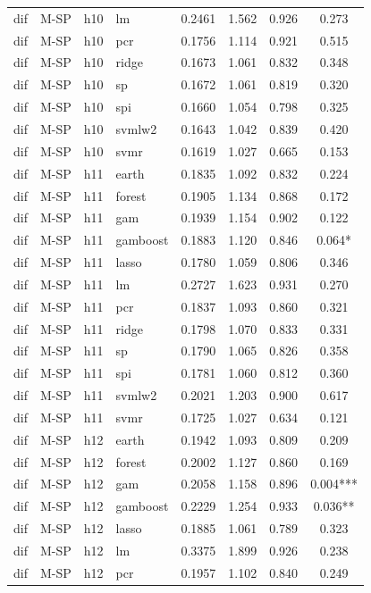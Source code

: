 \begin{ThreePartTable}
\begin{longtable}[t]{llclcccc}
dif & M-SP & h10 & lm & 0.2461 & 1.562 & 0.926 & 0.273\\
dif & M-SP & h10 & pcr & 0.1756 & 1.114 & 0.921 & 0.515\\
dif & M-SP & h10 & ridge & 0.1673 & 1.061 & 0.832 & 0.348\\
dif & M-SP & h10 & sp & 0.1672 & 1.061 & 0.819 & 0.320\\
dif & M-SP & h10 & spi & 0.1660 & 1.054 & 0.798 & 0.325\\
dif & M-SP & h10 & svmlw2 & 0.1643 & 1.042 & 0.839 & 0.420\\
dif & M-SP & h10 & svmr & 0.1619 & 1.027 & 0.665 & 0.153\\
\addlinespace
dif & M-SP & h11 & earth & 0.1835 & 1.092 & 0.832 & 0.224\\
dif & M-SP & h11 & forest & 0.1905 & 1.134 & 0.868 & 0.172\\
dif & M-SP & h11 & gam & 0.1939 & 1.154 & 0.902 & 0.122\\
dif & M-SP & h11 & gamboost & 0.1883 & 1.120 & 0.846 & 0.064*\\
dif & M-SP & h11 & lasso & 0.1780 & 1.059 & 0.806 & 0.346\\
dif & M-SP & h11 & lm & 0.2727 & 1.623 & 0.931 & 0.270\\
dif & M-SP & h11 & pcr & 0.1837 & 1.093 & 0.860 & 0.321\\
dif & M-SP & h11 & ridge & 0.1798 & 1.070 & 0.833 & 0.331\\
dif & M-SP & h11 & sp & 0.1790 & 1.065 & 0.826 & 0.358\\
dif & M-SP & h11 & spi & 0.1781 & 1.060 & 0.812 & 0.360\\
dif & M-SP & h11 & svmlw2 & 0.2021 & 1.203 & 0.900 & 0.617\\
dif & M-SP & h11 & svmr & 0.1725 & 1.027 & 0.634 & 0.121\\
\addlinespace
dif & M-SP & h12 & earth & 0.1942 & 1.093 & 0.809 & 0.209\\
dif & M-SP & h12 & forest & 0.2002 & 1.127 & 0.860 & 0.169\\
dif & M-SP & h12 & gam & 0.2058 & 1.158 & 0.896 & 0.004***\\
dif & M-SP & h12 & gamboost & 0.2229 & 1.254 & 0.933 & 0.036**\\
dif & M-SP & h12 & lasso & 0.1885 & 1.061 & 0.789 & 0.323\\
dif & M-SP & h12 & lm & 0.3375 & 1.899 & 0.926 & 0.238\\
dif & M-SP & h12 & pcr & 0.1957 & 1.102 & 0.840 & 0.249\\

\end{longtable}
\end{ThreePartTable}
